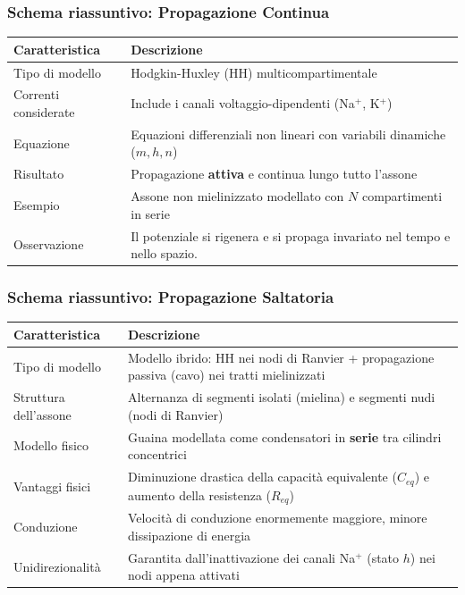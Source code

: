 \subsubsection{Schema riassuntivo: Propagazione Continua}
\begin{table}[H]
\centering
\renewcommand{\arraystretch}{1.5}
\begin{tabularx}{\textwidth}{l X}
\toprule
\textbf{Caratteristica} & \textbf{Descrizione} \\
\midrule
Tipo di modello & Hodgkin-Huxley (HH) multicompartimentale \\
Correnti considerate & Include i canali voltaggio-dipendenti (Na$^+$, K$^+$) \\
Equazione & Equazioni differenziali non lineari con variabili dinamiche ($m, h, n$) \\
Risultato & Propagazione \textbf{attiva} e continua lungo tutto l’assone \\
Esempio & Assone non mielinizzato modellato con $N$ compartimenti in serie \\
Osservazione & Il potenziale si rigenera e si propaga invariato nel tempo e nello spazio. \\
\bottomrule
\end{tabularx}
\end{table}

\subsubsection{Schema riassuntivo: Propagazione Saltatoria}
\begin{table}[H]
\centering
\renewcommand{\arraystretch}{1.5}
\begin{tabularx}{\textwidth}{l X}
\toprule
\textbf{Caratteristica} & \textbf{Descrizione} \\
\midrule
Tipo di modello & Modello ibrido: HH nei nodi di Ranvier + propagazione passiva (cavo) nei tratti mielinizzati \\
Struttura dell’assone & Alternanza di segmenti isolati (mielina) e segmenti nudi (nodi di Ranvier) \\
Modello fisico & Guaina modellata come condensatori in \textbf{serie} tra cilindri concentrici \\
Vantaggi fisici & Diminuzione drastica della capacità equivalente ($C_{eq}$) e aumento della resistenza ($R_{eq}$) \\
Conduzione & Velocità di conduzione enormemente maggiore, minore dissipazione di energia \\
Unidirezionalità & Garantita dall’inattivazione dei canali Na$^+$ (stato $h$) nei nodi appena attivati \\
\bottomrule
\end{tabularx}
\end{table}

